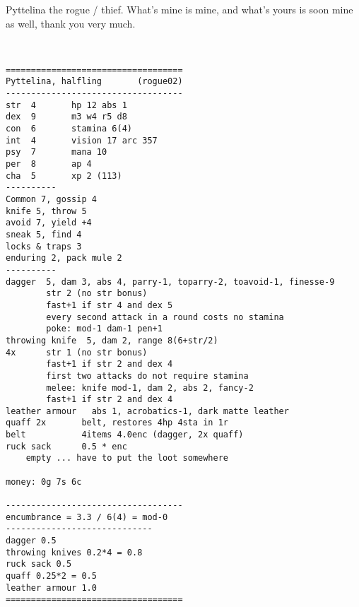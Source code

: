 \clearpage
\begin{samepage}

\noindent Pyttelina the rogue / thief. What's mine is mine, and what's yours is soon mine as well, thank you very much.

\

\small \begin{verbatim}
===================================
Pyttelina, halfling       (rogue02)
-----------------------------------
str  4       hp 12 abs 1
dex  9       m3 w4 r5 d8
con  6       stamina 6(4)
int  4       vision 17 arc 357
psy  7       mana 10
per  8       ap 4
cha  5       xp 2 (113)
----------
Common 7, gossip 4
knife 5, throw 5
avoid 7, yield +4
sneak 5, find 4
locks & traps 3
enduring 2, pack mule 2
----------
dagger  5, dam 3, abs 4, parry-1, toparry-2, toavoid-1, finesse-9
        str 2 (no str bonus)
        fast+1 if str 4 and dex 5
        every second attack in a round costs no stamina
        poke: mod-1 dam-1 pen+1
throwing knife  5, dam 2, range 8(6+str/2)
4x      str 1 (no str bonus)
        fast+1 if str 2 and dex 4
        first two attacks do not require stamina
        melee: knife mod-1, dam 2, abs 2, fancy-2
        fast+1 if str 2 and dex 4
leather armour   abs 1, acrobatics-1, dark matte leather
quaff 2x       belt, restores 4hp 4sta in 1r
belt           4items 4.0enc (dagger, 2x quaff)
ruck sack      0.5 * enc
    empty ... have to put the loot somewhere

money: 0g 7s 6c

-----------------------------------
encumbrance = 3.3 / 6(4) = mod-0
-----------------------------
dagger 0.5
throwing knives 0.2*4 = 0.8
ruck sack 0.5
quaff 0.25*2 = 0.5
leather armour 1.0
===================================
\end{verbatim} \end{samepage} \normalsize







